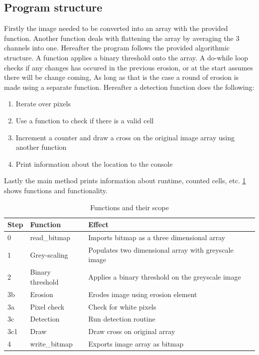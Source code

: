 \documentclass[a4paper, english]{article}
\numberwithin{equation}{section}
\begin{document}
\subsection{Program structure}
Firstly the image needed to be converted into an array with the provided function. Another function deals with flattening the array by averaging the 3 channels into one. Hereafter the program follows the provided algorithmic structure. A function applies a binary threshold onto the array. A do-while loop checks if any changes has occured in the previous erosion, or at the start assumes there will be change coming, As long as that is the case a round of erosion is made using a separate function. Hereafter a detection function does the following:
\begin{enumerate}
    \item Iterate over pixels
    \item Use a function to check if there is a valid cell
    \item Increment a counter and draw a cross on the original image array using another function
    \item Print information about the location to the console
\end{enumerate}
Lastly the main method prints information about runtime, counted cells, etc. \cref{tbl:func} shows functions and functionality.
\begin{table}
    \centering
    \caption{Functions and their scope}\label{tbl:func}
    \begin{tabular}{lll}
        \toprule
        Step & Function         & Effect                                               \\
        \midrule
        0    & read\_bitmap     & Imports bitmap as a three dimensional array          \\
        1    & Grey-scaling     & Populates two dimensional array with greyscale image \\
        2    & Binary threshold & Applies a binary threshold on the greyscale image    \\
        3b   & Erosion          & Erodes image using erosion element                   \\
        3a   & Pixel check      & Check for white pixels                               \\
        3c   & Detection        & Run detection routine                                \\
        3c1  & Draw             & Draw cross on original array                         \\
        4    & write\_bitmap    & Exports image array as bitmap                        \\
        \bottomrule
    \end{tabular}
\end{table}
\end{document}
